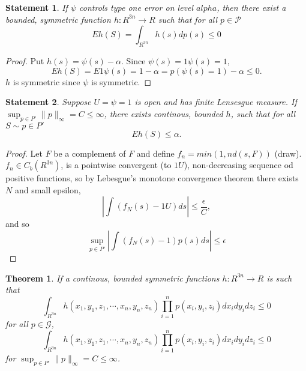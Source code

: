 \documentclass{article}
\newtheorem{Theorem}{Theorem}
\newtheorem{statement}{Statement}
\begin{document}
 
 
\begin{statement}
If $\psi$ controls type one error on level $alpha$, then there exist a bounded, symmetric function $h: R^{3n} \to R$ such that for all $p \in \mathcal{P}$ 
\[
 E h(S) = \int_{R^{3n}} h(s) dp(s)  \leq 0
\]
\end{statement}

\begin{proof}
 Put $h(s) = \psi(s) - \alpha$. Since $\psi(s)= 1{ \psi(s)=1} $, 
 \[
  E h(S)  = E 1{ \psi(s)=1}  - \alpha = p(\psi(s)=1)  - \alpha \leq 0.
 \]
$h$ is symmetric since $\psi$ is symmetric. 
\end{proof}



\begin{statement}
 Suppose $U= {\psi =1}$ is open and has finite Lensesgue measure. If $\sup_{p \in P'} \| p \|_{\infty} =C \leq \infty$, there exists continous, bounded $h$, such that for all $S \sim p \in P'$
 \[
  E h(S) \leq \alpha.
 \]

\end{statement}
\begin{proof}
 Let $F$ be a complement of $F$ and define $f_n = min(1,nd(s,F))$ (draw). $f_n \in C_b(R^{3n})$, is a  pointwise convergent (to $1U$), non-decreasing sequence od positive functions, so by Lebesgue's monotone convergence theorem there exists $N$ and small epsilon, 
 \[
 |\int (f_N(s) -1U) ds | \leq \frac{ \epsilon}{ C },
 \]
 and so
 \[
  \sup_{p \in P'} | \int (f_N(s) -1) p(s) ds | \leq \epsilon
 \]

\end{proof}

\begin{Theorem}
\label{th:1}
If a continous, bounded symmetric functions $h : R^{3n} \to R$ is such that 
\[
 \int_{R^{3n}} h(x_1,y_1,z_1,\cdots,x_n,y_n,z_n) \prod_{i=1}^n p(x_i,y_i,z_i) d x_i d y_i d z_i \leq 0
\]
for all $p \in \mathcal G$,
\[
 \int_{R^{3n}} h(x_1,y_1,z_1,\cdots,x_n,y_n,z_n) \prod_{i=1}^n p(x_i,y_i,z_i) d x_i d y_i d z_i \leq 0
\]
for $\sup_{p \in P'} \| p \|_{\infty} =C \leq \infty$.
\end{Theorem}
\end{document}
